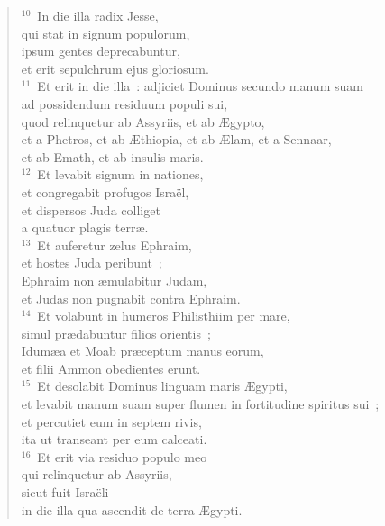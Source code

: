 \begin{flushleft}\begin{verse}${}^{10}$~In die illa radix Jesse,\\ qui stat in signum populorum,\\ ipsum gentes deprecabuntur,\\ et erit sepulchrum ejus gloriosum.\\
${}^{11}$~Et erit in die illa~: adjiciet Dominus secundo manum suam\\ ad possidendum residuum populi sui,\\ quod relinquetur ab Assyriis, et ab \AE gypto,\\ et a Phetros, et ab \AE thiopia, et ab \AE lam, et a Sennaar,\\ et ab Emath, et ab insulis maris.\\
${}^{12}$~Et levabit signum in nationes,\\ et congregabit profugos Isra\"el,\\ et dispersos Juda colliget\\ a quatuor plagis terr\ae .\\
${}^{13}$~Et auferetur zelus Ephraim,\\ et hostes Juda peribunt~;\\ Ephraim non \ae mulabitur Judam,\\ et Judas non pugnabit contra Ephraim.\\
${}^{14}$~Et volabunt in humeros Philisthiim per mare,\\ simul pr\ae dabuntur filios orientis~;\\ Idum\ae a et Moab pr\ae ceptum manus eorum,\\ et filii Ammon obedientes erunt.\\
${}^{15}$~Et desolabit Dominus linguam maris \AE gypti,\\ et levabit manum suam super flumen in fortitudine spiritus sui~;\\ et percutiet eum in septem rivis,\\ ita ut transeant per eum calceati.\\
${}^{16}$~Et erit via residuo populo meo\\ qui relinquetur ab Assyriis,\\ sicut fuit Isra\"eli\\ in die illa qua ascendit de terra \AE gypti.\end{verse}\end{flushleft}


